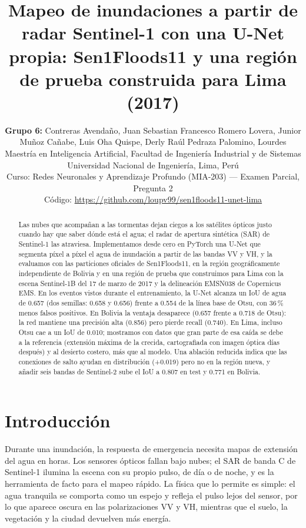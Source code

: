 \documentclass{article}
\title{Mapeo de inundaciones a partir de radar Sentinel-1 con una U-Net propia: Sen1Floods11 y una región de prueba construida para Lima (2017)}
\author{%
  \textbf{Grupo 6:} Contreras Avendaño, Juan Sebastian Francesco \quad Romero Lovera, Junior \\
  Muñoz Cañabe, Luis \quad Oha Quispe, Derly Raúl \quad Pedraza Palomino, Lourdes \\
  Maestría en Inteligencia Artificial, Facultad de Ingeniería Industrial y de Sistemas \\
  Universidad Nacional de Ingeniería, Lima, Perú \\
  Curso: Redes Neuronales y Aprendizaje Profundo (MIA-203) --- Examen Parcial, Pregunta 2 \\
  Código: \url{https://github.com/loupv99/sen1floods11-unet-lima}
}
\begin{document}
\maketitle

\begin{abstract}
Las nubes que acompañan a las tormentas dejan ciegos a los satélites ópticos justo cuando hay que saber dónde está el agua; el radar de apertura sintética (SAR) de Sentinel-1 las atraviesa. Implementamos desde cero en PyTorch una U-Net que segmenta píxel a píxel el agua de inundación a partir de las bandas VV y VH, y la evaluamos con las particiones oficiales de Sen1Floods11, en la región geográficamente independiente de Bolivia y en una región de prueba que construimos para Lima con la escena Sentinel-1B del 17 de marzo de 2017 y la delineación EMSN038 de Copernicus EMS. En los eventos vistos durante el entrenamiento, la U-Net alcanza un IoU de agua de 0.657 (dos semillas: 0.658 y 0.656) frente a 0.554 de la línea base de Otsu, con 36\,\% menos falsos positivos. En Bolivia la ventaja desaparece (0.657 frente a 0.718 de Otsu): la red mantiene una precisión alta (0.856) pero pierde recall (0.740). En Lima, incluso Otsu cae a un IoU de 0.010; mostramos con datos que gran parte de esa caída se debe a la referencia (extensión máxima de la crecida, cartografiada con imagen óptica días después) y al desierto costero, más que al modelo. Una ablación reducida indica que las conexiones de salto ayudan en distribución (+0.019) pero no en la región nueva, y añadir seis bandas de Sentinel-2 sube el IoU a 0.807 en test y 0.771 en Bolivia.
\end{abstract}

\section{Introducción}
Durante una inundación, la respuesta de emergencia necesita mapas de extensión del agua en horas. Los sensores ópticos fallan bajo nubes; el SAR de banda C de Sentinel-1 ilumina la escena con su propio pulso, de día o de noche, y es la herramienta de facto para el mapeo rápido. La física que lo permite es simple: el agua tranquila se comporta como un espejo y refleja el pulso lejos del sensor, por lo que aparece oscura en las polarizaciones VV y VH, mientras que el suelo, la vegetación y la ciudad devuelven más energía.
\end{document}
